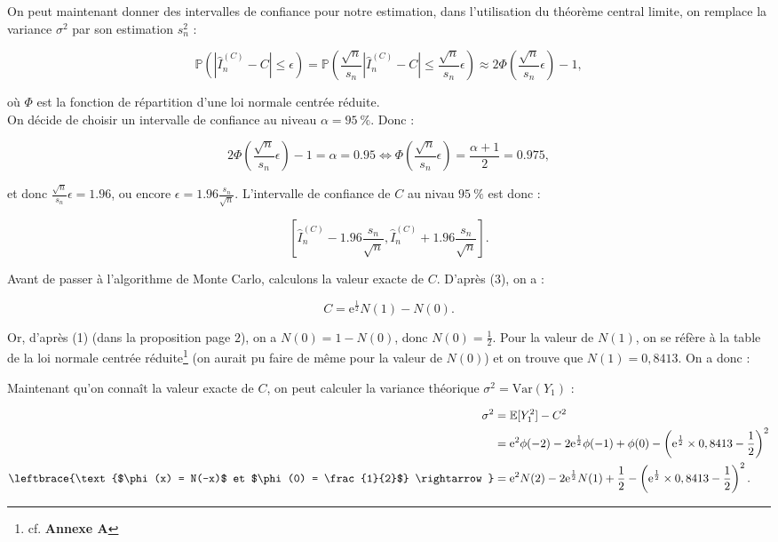 \documentclass{article}
\theoremstyle{exostyle}
\newenvironment{questions}{
\begin{enumerate}[\hspace{12pt} 1.]}{\end{enumerate}}
\begin{document}
\begin{questions}
\bigbreak

On peut maintenant donner des intervalles de confiance pour notre estimation, dans l'utilisation du théorème central limite, on remplace la variance $\sigma^{2}$ par son estimation $s_{n}^{2}$ : 

\[\mathbb{P} \left( \left| \hat{I}_{n}^{(C)} - C \right| \leq \epsilon \right) = \mathbb{P} \left( \frac{\sqrt{n}}{s_{n}} \left| \hat{I}_{n}^{(C)} - C \right| \leq \frac{\sqrt{n}}{s_{n}} \epsilon \right) \approx 2 \Phi \left( \frac{\sqrt{n}}{s_{n}}\epsilon\right)-1,\]

où $\Phi$ est la fonction de répartition d'une loi normale centrée réduite.\\

On décide de choisir un intervalle de confiance au niveau $\alpha = 95 \ \%$. Donc : 

\[2\Phi \left( \frac{\sqrt{n}}{s_{n}}\epsilon\right)-1 = \alpha = 0.95 \Leftrightarrow \Phi \left(\frac{\sqrt{n}}{s_{n}}\epsilon\right) = \frac{\alpha+1}{2} = 0.975,\]

et donc $\frac{\sqrt{n}}{s_{n}}\epsilon = 1.96$, ou encore $\epsilon = 1.96 \frac{s_{n}}{\sqrt{n}}$. L'intervalle de confiance de $C$ au nivau $95 \ \%$ est donc :

\[ \left[ \hat{I}_{n}^{(C)} - 1.96 \frac{s_{n}}{\sqrt{n}}, \hat{I}_{n}^{(C)} + 1.96 \frac{s_{n}}{\sqrt{n}} \right].\]

Avant de passer à l'algorithme de Monte Carlo, calculons la valeur exacte de $C$. D'après (3), on a : 

\[C = \text{e}^{\frac{1}{2}} N(1) - N(0).\]

Or, d'après (1) (dans la proposition page $2$), on a $N(0) = 1 - N(0)$, donc $N(0) = \frac{1}{2}$. Pour la valeur de $N(1)$, on se réfère à la table de la loi normale centrée réduite\footnote{cf. \textbf{Annexe A}} (on aurait pu faire de même pour la valeur de $N(0)$) et on trouve que $N(1) = 0,8413$. On a donc : 

\hspace{5.41cm}

Maintenant qu'on connaît la valeur exacte de $C$, on peut calculer la variance théorique $\sigma^{2} = \text{Var}(Y_{1})$ : 

\begin{align*}
    \sigma^{2} &= \mathbb{E} [Y_{1}^{2}] - C^{2}\\
    &= \text{e}^{2} \phi(-2) -2\text{e}^{\frac{1}{2}} \phi(-1) + \phi(0) - \left( \text{e}^{\frac{1}{2}} \times 0,8413 - \frac{1}{2} \right)^{2}\\
    \leftbrace{\text{$\phi(x) = N(-x)$ et $\phi(0) = \frac{1}{2}$} \rightarrow}&= \text{e}^{2} N(2) -2\text{e}^{\frac{1}{2}} N(1) + \frac{1}{2} - \left( \text{e}^{\frac{1}{2}} \times 0,8413 - \frac{1}{2} \right)^{2}.
\end{align*}


\end{questions}
\end{document}
